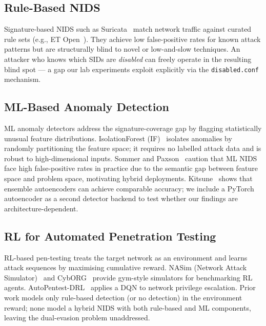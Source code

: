 \documentclass[sigconf]{acmart}
\begin{document}
\subsection{Rule-Based NIDS}
\label{sec:bg:rulebased}

Signature-based NIDS such as Suricata~\cite{oisf2010suricata} match
network traffic against curated rule sets (e.g., ET
Open~\cite{etopen2024}). They achieve low false-positive rates for
known attack patterns but are structurally blind to novel or
low-and-slow techniques. An attacker who knows which SIDs are
\emph{disabled} can freely operate in the resulting blind spot --- a
gap our lab experiments exploit explicitly via the \texttt{disabled.conf}
mechanism.

\subsection{ML-Based Anomaly Detection}
\label{sec:bg:anomaly}

ML anomaly detectors address the signature-coverage gap by flagging
statistically unusual feature distributions. IsolationForest
(IF)~\cite{liu2008isolation} isolates anomalies by randomly partitioning
the feature space; it requires no labelled attack data and is robust
to high-dimensional inputs. Sommer and Paxson~\cite{sommer2010outside}
caution that ML NIDS face high false-positive rates in practice due to
the semantic gap between feature space and problem space, motivating
hybrid deployments. Kitsune~\cite{mirsky2018kitsune} shows that
ensemble autoencoders can achieve comparable accuracy; we include a
PyTorch autoencoder as a second detector backend to test whether our
findings are architecture-dependent.

\subsection{RL for Automated Penetration Testing}
\label{sec:bg:rl}

RL-based pen-testing treats the target network as an environment and
learns attack sequences by maximising cumulative reward. NASim
(Network Attack Simulator)~\cite{schwartz2020nasim} and
CybORG~\cite{standen2021cyborg} provide gym-style simulators for
benchmarking RL agents. AutoPentest-DRL~\cite{chaudhary2022autopentest}
applies a DQN to network privilege escalation. Prior work models
only rule-based detection (or no detection) in the environment reward;
none model a hybrid NIDS with both rule-based and ML components,
leaving the dual-evasion problem unaddressed.
\end{document}
